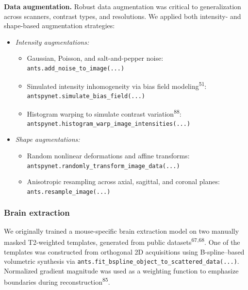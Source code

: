 \documentclass[
  12pt,
]{article}
\providecommand{\tightlist}{%
  \setlength{\itemsep}{0pt}\setlength{\parskip}{0pt}}
\begin{document}
\textbf{Data augmentation.} Robust data augmentation was critical to
generalization across scanners, contrast types, and resolutions. We
applied both intensity- and shape-based augmentation strategies:

\begin{itemize}
\item
  \emph{Intensity augmentations:}

  \begin{itemize}
  \tightlist
  \item
    Gaussian, Poisson, and salt-and-pepper noise:\\
    \texttt{ants.add\_noise\_to\_image(...)}
  \item
    Simulated intensity inhomogeneity via bias field
    modeling\textsuperscript{51}:\\
    \texttt{antspynet.simulate\_bias\_field(...)}
  \item
    Histogram warping to simulate contrast
    variation\textsuperscript{88}:\\
    \texttt{antspynet.histogram\_warp\_image\_intensities(...)}
  \end{itemize}
\item
  \emph{Shape augmentations:}

  \begin{itemize}
  \tightlist
  \item
    Random nonlinear deformations and affine transforms:\\
    \texttt{antspynet.randomly\_transform\_image\_data(...)}
  \item
    Anisotropic resampling across axial, sagittal, and coronal planes:\\
    \texttt{ants.resample\_image(...)}
  \end{itemize}
\end{itemize}

\subsubsection{Brain extraction}\label{brain-extraction}

We originally trained a mouse-specific brain extraction model on two
manually masked T2-weighted templates, generated from public
datasets\textsuperscript{67,68}. One of the templates was constructed
from orthogonal 2D acquisitions using B-spline--based volumetric
synthesis via
\texttt{ants.fit\_bspline\_object\_to\_scattered\_data(...)}. Normalized
gradient magnitude was used as a weighting function to emphasize
boundaries during reconstruction\textsuperscript{85}.
\end{document}
